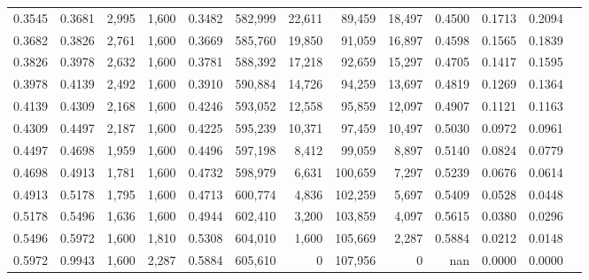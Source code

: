 \begin{tabular}{rrrrrrrrrrrrr}
0.3545 & 0.3681 &  2,995 & 1,600 &                                     0.3482 & 582,999 &  22,611 &  89,459 &  18,497 & 0.4500 & 0.1713 & 0.2094 \\
0.3682 & 0.3826 &  2,761 & 1,600 &                                     0.3669 & 585,760 &  19,850 &  91,059 &  16,897 & 0.4598 & 0.1565 & 0.1839 \\
0.3826 & 0.3978 &  2,632 & 1,600 &                                     0.3781 & 588,392 &  17,218 &  92,659 &  15,297 & 0.4705 & 0.1417 & 0.1595 \\
0.3978 & 0.4139 &  2,492 & 1,600 &                                     0.3910 & 590,884 &  14,726 &  94,259 &  13,697 & 0.4819 & 0.1269 & 0.1364 \\
0.4139 & 0.4309 &  2,168 & 1,600 &                                     0.4246 & 593,052 &  12,558 &  95,859 &  12,097 & 0.4907 & 0.1121 & 0.1163 \\
0.4309 & 0.4497 &  2,187 & 1,600 &                                     0.4225 & 595,239 &  10,371 &  97,459 &  10,497 & 0.5030 & 0.0972 & 0.0961 \\
0.4497 & 0.4698 &  1,959 & 1,600 &                                     0.4496 & 597,198 &   8,412 &  99,059 &   8,897 & 0.5140 & 0.0824 & 0.0779 \\
0.4698 & 0.4913 &  1,781 & 1,600 &                                     0.4732 & 598,979 &   6,631 & 100,659 &   7,297 & 0.5239 & 0.0676 & 0.0614 \\
0.4913 & 0.5178 &  1,795 & 1,600 &                                     0.4713 & 600,774 &   4,836 & 102,259 &   5,697 & 0.5409 & 0.0528 & 0.0448 \\
0.5178 & 0.5496 &  1,636 & 1,600 &                                     0.4944 & 602,410 &   3,200 & 103,859 &   4,097 & 0.5615 & 0.0380 & 0.0296 \\
0.5496 & 0.5972 &  1,600 & 1,810 &                                     0.5308 & 604,010 &   1,600 & 105,669 &   2,287 & 0.5884 & 0.0212 & 0.0148 \\
0.5972 & 0.9943 &  1,600 & 2,287 &                                     0.5884 & 605,610 &       0 & 107,956 &       0 &    nan & 0.0000 & 0.0000 \\
\bottomrule
\end{tabular}
